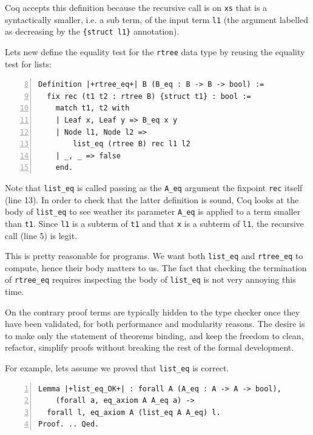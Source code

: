 \documentclass[sigplan,10pt,review]{acmart}\settopmatter{printfolios=true,printccs=false,printacmref=false}
\begin{document}
\noindent
Coq accepts this definition because
the recursive call is on \lstinline+xs+ that is a syntactically
smaller, i.e. a sub term, of the input term \lstinline+l1+ (the
argument labelled as decreasing by the \lstinline+{struct l1}+
annotation).

Lets new define the equality test for the \lstinline+rtree+ data type
by reusing the equality test for lists:

\begin{minipage}{\textwidth}\begin{lstlisting}[numbers=left,firstnumber=8]
Definition |+rtree_eq+| B (B_eq : B -> B -> bool) :=
  fix rec (t1 t2 : rtree B) {struct t1} : bool :=
    match t1, t2 with
    | Leaf x, Leaf y => B_eq x y
    | Node l1, Node l2 =>
        list_eq (rtree B) rec l1 l2
    | _, _ => false
    end.
\end{lstlisting}\end{minipage}

\noindent
Note that \lstinline+list_eq+ is called passing as the \lstinline+A_eq+
argument the fixpoint \lstinline+rec+ itself (line 13). In order to
check that the latter definition is sound, Coq looks at the body of
\lstinline+list_eq+ to see weather its parameter \lstinline+A_eq+ is
applied to a term smaller than \lstinline+t1+. Since
\lstinline+l1+ is a subterm of \lstinline+t1+ and that \lstinline+x+
is a subterm of \lstinline+l1+, the recursive call (line 5) is legit.

This is pretty reasonable for programs. We want both \lstinline+list_eq+
and \lstinline+rtree_eq+ to compute, hence their body matters to us.
The fact that checking the termination of \lstinline+rtree_eq+ requires
inspecting the body of \lstinline+list_eq+ is not very annoying this
time.

On the contrary proof terms are typically hidden to the type checker once
they have been validated, for both performance and modularity reasons.
The desire is to make only the statement of theorems binding, and keep
the freedom to clean, refactor, simplify proofs without breaking
the rest of the formal development. 

For example, lets assume we proved that \lstinline+list_eq+ is
correct.

\begin{minipage}{\textwidth}\begin{lstlisting}[numbers=left]
Lemma |+list_eq_OK+| : forall A (A_eq : A -> A -> bool),
    (forall a, eq_axiom A A_eq a) ->
  forall l, eq_axiom A (list_eq A A_eq) l.
Proof. .. Qed.
\end{lstlisting}\end{minipage}
\end{document}
